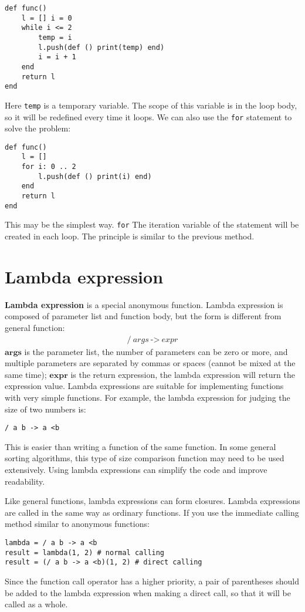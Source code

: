 \begin{lstlisting}[language=berry]
def func()
    l = [] i = 0
    while i <= 2
        temp = i
        l.push(def () print(temp) end)
        i = i + 1
    end
    return l
end
\end{lstlisting}
Here \texttt{temp} is a temporary variable. The scope of this variable is in the loop body, so it will be redefined every time it loops. We can also use the \texttt{for} statement to solve the problem:
\begin{lstlisting}[language=berry]
def func()
    l = []
    for i: 0 .. 2
        l.push(def () print(i) end)
    end
    return l
end
\end{lstlisting}
This may be the simplest way. \texttt{for} The iteration variable of the statement will be created in each loop. The principle is similar to the previous method.

\section {Lambda expression}

\textbf{Lambda expression} is a special anonymous function. Lambda expression is composed of parameter list and function body, but the form is different from general function: \vspace{-0.5em}
\begin{gather*}
    \texttt{/}\ args\ \texttt{->}\ expr
\end{gather*}
$\bm{args}$ is the parameter list, the number of parameters can be zero or more, and multiple parameters are separated by commas or spaces (cannot be mixed at the same time); $\bm{expr}$ is the return expression, the lambda expression will return the expression value. Lambda expressions are suitable for implementing functions with very simple functions. For example, the lambda expression for judging the size of two numbers is:
\begin{lstlisting}[language=berry, numbers=none]
/ a b -> a <b
\end{lstlisting}
This is easier than writing a function of the same function. In some general sorting algorithms, this type of size comparison function may need to be used extensively. Using lambda expressions can simplify the code and improve readability.

Like general functions, lambda expressions can form closures. Lambda expressions are called in the same way as ordinary functions. If you use the immediate calling method similar to anonymous functions:
\begin{lstlisting}[language=berry, numbers=none]
lambda = / a b -> a <b
result = lambda(1, 2) # normal calling
result = (/ a b -> a <b)(1, 2) # direct calling
\end{lstlisting}
Since the function call operator has a higher priority, a pair of parentheses should be added to the lambda expression when making a direct call, so that it will be called as a whole.